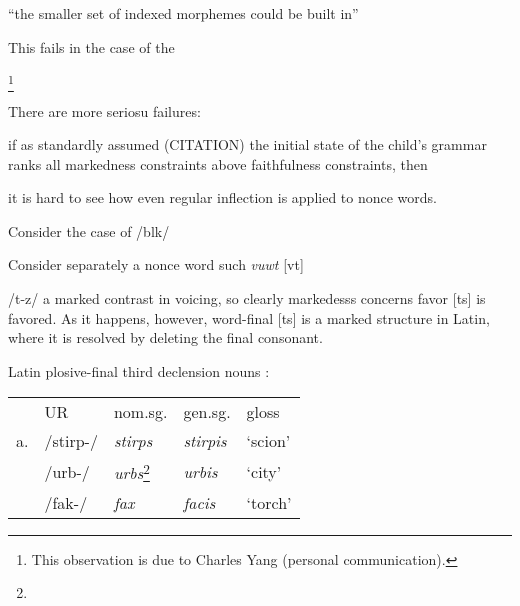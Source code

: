 \citep{Pater2000,Pater2005b,Pater2005a,Pater2006,Pater2009,Becker2009b}

``the smaller set of indexed morphemes could be built in'' \citep[][?]{Pater2009}

This fails in the case of the 






\footnote{This observation is due to Charles Yang (personal communication).}

There are more seriosu failures:

if as standardly assumed 
(CITATION)
the initial state of the child's grammar ranks all markedness constraints above faithfulness constraints, then 

it is hard to see how even regular inflection is applied to nonce words.

Consider the case of 
/bl\textsci k/

Consider separately a nonce word such 
\emph{vuwt} [v\textupsilon t]

/t-z/
a marked contrast in voicing, so clearly markedesss concerns favor [ts] is favored. As it happens, however, word-final [ts] is a marked structure in Latin,
where it is resolved by deleting the final consonant.

\ex \label{para} Latin plosive-final third declension nouns \citep[from][]{Gorman2011b}: 

\begin{tabular}{ r l l l l}
       & \textsc{UR}  & {nom.sg.} & {gen.sg.}         & {gloss} \\ \cmidrule{2-5}
    a. & /stirp-/   & \emph{stirps}   & \emph{stirpis}  & `scion'  \\
       & /urb-/     & \emph{urbs}\footnote{}   & \emph{urbis}    & `city'   \\
       & /fak-/     & \emph{fax}   & \emph{facis}    & `torch' \\
\end{tabular} \xe





